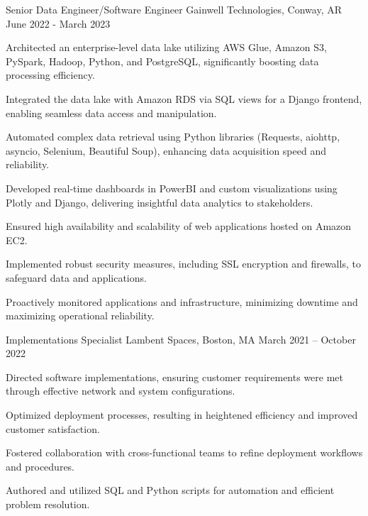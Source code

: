 \begin{cventries}

\cventry
{Senior Data Engineer/Software Engineer} %
{Gainwell Technologies, Conway, AR} %
{} %
{June 2022 - March 2023} %
{ %
\begin{cvitems}
\item {Architected an enterprise-level data lake utilizing AWS Glue, Amazon S3, PySpark, Hadoop, Python, and PostgreSQL, significantly boosting data processing efficiency.}
\item {Integrated the data lake with Amazon RDS via SQL views for a Django frontend, enabling seamless data access and manipulation.}
\item {Automated complex data retrieval using Python libraries (Requests, aiohttp, asyncio, Selenium, Beautiful Soup), enhancing data acquisition speed and reliability.}
\item {Developed real-time dashboards in PowerBI and custom visualizations using Plotly and Django, delivering insightful data analytics to stakeholders.}
\item {Ensured high availability and scalability of web applications hosted on Amazon EC2.}
\item {Implemented robust security measures, including SSL encryption and firewalls, to safeguard data and applications.}
\item {Proactively monitored applications and infrastructure, minimizing downtime and maximizing operational reliability.}
\end{cvitems}
}


\cventry
{Implementations Specialist} %
{Lambent Spaces, Boston, MA} %
{} %
{March 2021 – October 2022} %
{ %
\begin{cvitems}
\item {Directed software implementations, ensuring customer requirements were met through effective network and system configurations.}
\item {Optimized deployment processes, resulting in heightened efficiency and improved customer satisfaction.}
\item {Fostered collaboration with cross-functional teams to refine deployment workflows and procedures.}
\item {Authored and utilized SQL and Python scripts for automation and efficient problem resolution.}
\end{cvitems}
}


\end{cventries}
